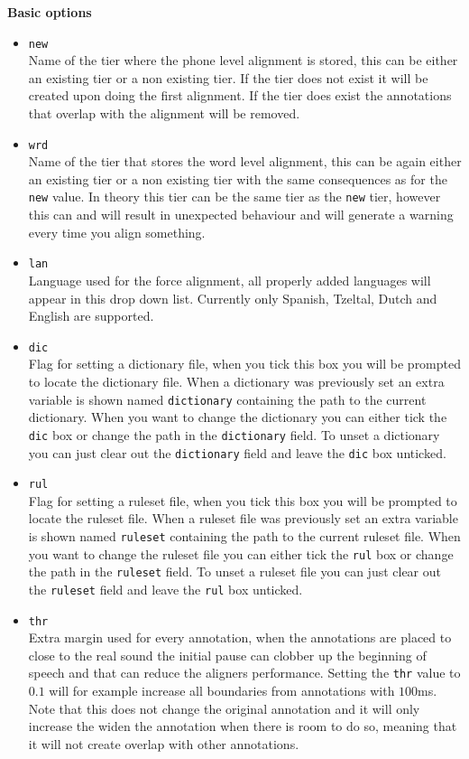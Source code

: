 \begin{itemize}
		\textbf{Basic options}	
		\begin{itemize}
			\item \texttt{new}\\
				Name of the tier where the phone level alignment is stored, this can be
				either an existing tier or a non existing tier. If the tier does not
				exist it will be created upon doing the first alignment. If the tier
				does exist the annotations that overlap with the alignment will be
				removed.
			\item \texttt{wrd}\\
				Name of the tier that stores the word level alignment, this can be
				again either an existing tier or a non existing tier with the same
				consequences as for the \texttt{new} value. In theory this tier can be
				the same tier as the \texttt{new} tier, however this can and will
				result in unexpected behaviour and will generate a warning every time
				you align something.
			\item \texttt{lan}\\
				Language used for the force alignment, all properly added languages
				will appear in this drop down list. Currently only Spanish, Tzeltal,
				Dutch and English are supported.
			\item \texttt{dic}\\
				Flag for setting a dictionary file, when you tick this box you
				will be prompted to locate the dictionary file. When a dictionary was
				previously set an extra variable is shown named \texttt{dictionary}
				containing the path to the current dictionary. When you want to change
				the dictionary you can either tick the \texttt{dic} box or change the
				path in the \texttt{dictionary} field. To unset a dictionary you can
				just clear out the \texttt{dictionary} field and leave the \texttt{dic}
				box unticked.
			\item \texttt{rul}\\
				Flag for setting a ruleset file, when you tick this box you will be
				prompted to locate the ruleset file. When a ruleset file was
				previously set an extra variable is shown named \texttt{ruleset}
				containing the path to the current ruleset file. When you want to
				change the ruleset file you can either tick the \texttt{rul} box or
				change the path in the \texttt{ruleset} field. To unset a ruleset file
				you can just clear out the \texttt{ruleset} field and leave the
				\texttt{rul} box unticked.
			\item \texttt{thr}\\
				Extra margin used for every annotation, when the annotations are placed
				to close to the real sound the initial pause can clobber up the
				beginning of speech and that can reduce the aligners performance.
				Setting the \texttt{thr} value to $0.1$ will for example increase all
				boundaries from annotations with $100$ms. Note that this does not
				change the original annotation and it will only increase the widen the
				annotation when there is room to do so, meaning that it will not create
				overlap with other annotations.
		\end{itemize}


\end{itemize}
